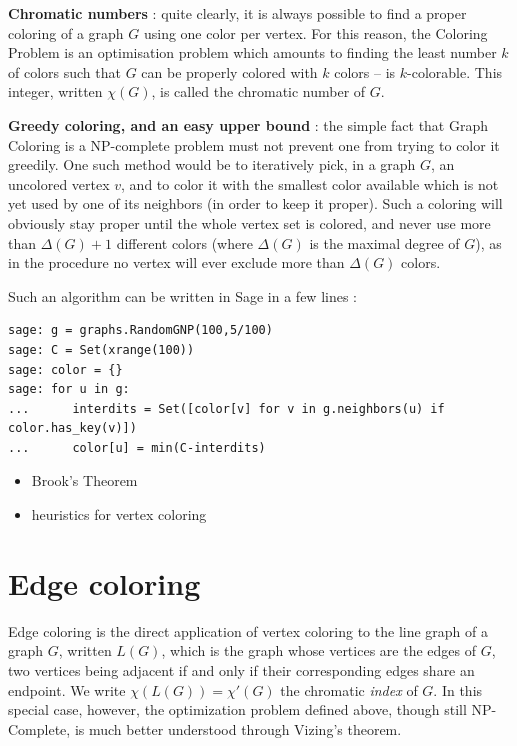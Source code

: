 {\bf Chromatic numbers} : quite clearly, it is always possible to find a proper coloring of a graph $G$ using one color per vertex. For this reason, the Coloring Problem is an optimisation problem which amounts to finding the least number $k$ of colors such that $G$ can be properly colored with $k$ colors -- is $k$-colorable. This integer, written $\chi(G)$, is called the chromatic number of $G$.

{\bf Greedy coloring, and an easy upper bound} : the simple fact that Graph Coloring is a NP-complete problem must not prevent one from trying to color it greedily. One such method would be to iteratively pick, in a graph $G$, an uncolored vertex $v$, and to color it with the smallest color available which is not yet used by one of its neighbors (in order to keep it proper). Such a coloring will obviously stay proper until the whole vertex set is colored, and never use more than $\Delta(G)+1$ different colors (where $\Delta(G)$ is the maximal degree of $G$), as in the procedure no vertex will ever exclude more than $\Delta(G)$ colors.

Such an algorithm can be written in Sage in a few lines :

\begin{lstlisting}
sage: g = graphs.RandomGNP(100,5/100)
sage: C = Set(xrange(100))
sage: color = {}
sage: for u in g:
...      interdits = Set([color[v] for v in g.neighbors(u) if color.has_key(v)])
...      color[u] = min(C-interdits)
\end{lstlisting}

\begin{itemize}
\item Brook's Theorem
\item heuristics for vertex coloring
\end{itemize}



\section{Edge coloring}

Edge coloring is the direct application of vertex coloring to the line graph of a graph $G$, written $L(G)$, which is the graph whose vertices are the edges of $G$, two vertices being adjacent if and only if their corresponding edges share an endpoint. We write $\chi(L(G)) = \chi'(G)$ the chromatic {\it index} of $G$. In this special case, however, the optimization problem defined above, though still NP-Complete, is much better understood through Vizing's theorem.

